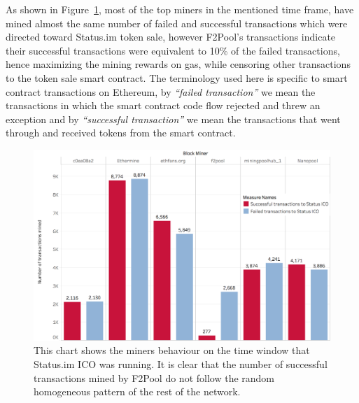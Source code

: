 As shown in Figure~\ref{fig:Transactions_miners_while_status_ico_cut}, most of the top miners in the mentioned time frame, have mined almost the same number of failed and successful transactions which were directed toward Status.im token sale, however F2Pool's transactions indicate their successful transactions were equivalent to 10\% of the failed transactions, hence maximizing the mining rewards on gas, while censoring other transactions to the token sale smart contract. The terminology used here is specific to smart contract transactions on Ethereum, by \textit{``failed transaction''} we mean the transactions in which the smart contract code flow rejected and threw an exception and by \textit{``successful transaction''} we mean the transactions that went through and received tokens from the smart contract. 


\begin{figure}[t]
\centering
\includegraphics[width=0.9\linewidth]{figures/Transactions_miners_while_status_ico_cut_only_icotx.png}
\caption{\scriptsize This chart shows the miners behaviour on the time window that Status.im ICO was running. It is clear that the number of successful transactions mined by F2Pool do not follow the random homogeneous pattern of the rest of the network. \label{fig:Transactions_miners_while_status_ico_cut}} 
\end{figure}


